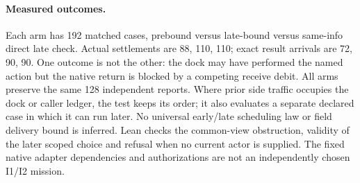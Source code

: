 \documentclass{article}
\begin{document}
\paragraph{Measured outcomes.}
Each arm has 192 matched cases, prebound versus late-bound versus
same-info direct late check. Actual settlements are 88, 110, 110;
exact result arrivals are 72, 90, 90. One outcome is not the
other: the dock may have performed the named action but the
native return is blocked by a competing receive debit. All arms
preserve the same 128 independent reports. Where prior side
traffic occupies the dock or caller ledger, the test keeps its order;
it also evaluates a separate declared case in which it can run
later. No universal early/late scheduling law or field delivery
bound is inferred. Lean checks the common-view obstruction,
validity of the later scoped choice and refusal when no current
actor is supplied. The fixed native adapter dependencies and
authorizations are not an independently chosen I1/I2 mission.
\end{document}
